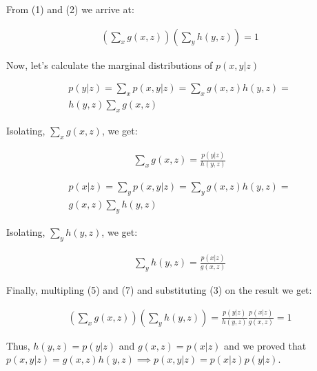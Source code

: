 \documentclass[a4paper,10pt]{book}
\begin{document}
From (1) and (2) we arrive at:

\begin{equation}
\begin{split}
(\sum_{x}g(x,z))(\sum_{y}h(y,z)) = 1
\end{split}
\end{equation}

Now, let's calculate the marginal distributions of $p(x,y|z)$

\begin{equation}
\begin{split}
p(y | z) = \sum_{x}p(x,y|z) = \sum_{x}g(x,z)h(y,z) = \\
h(y,z)\sum_{x}g(x,z)
\end{split}
\end{equation}

Isolating, $\sum_{x}g(x,z)$, we get:

\begin{equation}
\begin{split}
\sum_{x}g(x,z) = \frac{p(y | z)}{h(y,z)}
\end{split}
\end{equation}

\begin{equation}
\begin{split}
p(x | z) = \sum_{y}p(x,y|z) = \sum_{y}g(x,z)h(y,z) = \\
g(x,z)\sum_{y}h(y,z)
\end{split}
\end{equation}

Isolating, $\sum_{y}h(y,z)$, we get:

\begin{equation}
\begin{split}
\sum_{y}h(y,z) = \frac{p(x | z)}{g(x,z)}
\end{split}
\end{equation}

Finally, multipling (5) and (7) and substituting (3) on the result we get:

\begin{equation}
\begin{split}
(\sum_{x}g(x,z))(\sum_{y}h(y,z)) = \frac{p(y | z)}{h(y,z)}\frac{p(x | z)}{g(x,z)} = 1
\end{split}
\end{equation}

Thus, $h(y,z) = p(y | z)$ and $g(x,z) = p(x | z)$ and we proved that 
$p(x,y|z) = g(x,z)h(y,z) \implies p(x,y|z) = p(x|z)p(y|z)$.
\end{document}
